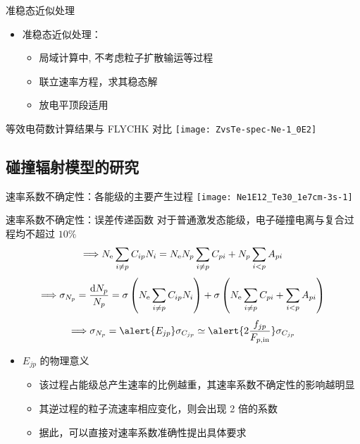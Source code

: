\begin{CJK*}{UTF8}{kai}
\begin{frame}{准稳态近似处理}
	\begin{itemize}%
		\item 准稳态近似处理：%
			\begin{itemize}
				\item 局域计算中, 不考虑粒子扩散输运等过程
				\item 联立速率方程，求其稳态解
				\item 放电平顶段适用
			\end{itemize}
	\end{itemize}

\end{frame}

\begin{frame}{等效电荷数计算结果与 FLYCHK 对比}
	\centering
	\texttt{[image: ZvsTe-spec-Ne-1\_0E2]}
\end{frame}

\subsection{碰撞辐射模型的研究}

\begin{frame}{速率系数不确定性：各能级的主要产生过程}
	\centering
	\texttt{[image: Ne1E12\_Te30\_1e7cm-3s-1]}
\end{frame}

\begin{frame}{速率系数不确定性：误差传递函数}
	\centering
	对于普通激发态能级，电子碰撞电离与复合过程均不超过 $10\%$
	$$\Longrightarrow N_{\rm e}\sum_{i\ne p}C_{ip}N_i=N_{\rm e}N_p\sum_{i\ne p}C_{pi}+N_p\sum_{i<p}A_{pi}$$
	$$\Longrightarrow \sigma_{N_p}=\frac{{\rm d}N_p}{N_p} = \sigma\left(N_{\rm e}\sum_{i\ne p}C_{ip}N_i\right) + \sigma\left(N_{\rm e}\sum_{i\ne p}C_{pi}+\sum_{i<p}A_{pi}\right)$$
	$$\Longrightarrow \sigma_{N_p}=\alert{E_{jp}}\sigma_{C_{jp}}\simeq\alert{2\frac{f_{jp}}{F_{p,{\rm in}}}}\sigma_{C_{jp}}$$
	\begin{itemize}
		\item $E_{jp}$ 的物理意义
			\begin{itemize}
				\item 该过程占能级总产生速率的比例越重，其速率系数不确定性的影响越明显
				\item 其逆过程的粒子流速率相应变化，则会出现 2 倍的系数
				\item 据此，可以\alert{直接}对速率系数准确性提出具体要求
			\end{itemize}
	\end{itemize}
\end{frame}


\end{CJK*}
